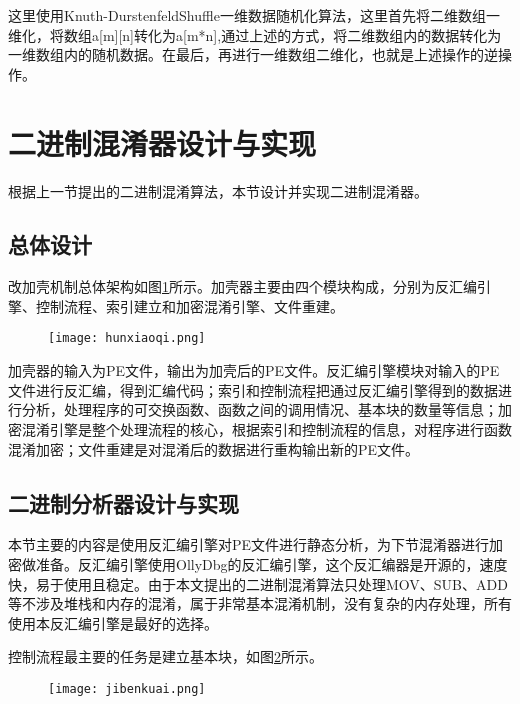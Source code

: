 这里使用Knuth-DurstenfeldShuffle一维数据随机化算法，这里首先将二维数组一维化，将数组a[m][n]转化为a[m*n],通过上述的方式，将二维数组内的数据转化为一维数组内的随机数据。在最后，再进行一维数组二维化，也就是上述操作的逆操作。


\section{二进制混淆器设计与实现}

根据上一节提出的二进制混淆算法，本节设计并实现二进制混淆器。

\subsection{总体设计}

改加壳机制总体架构如图\ref{hunxiaoqi}所示。加壳器主要由四个模块构成，分别为反汇编引擎、控制流程、索引建立和加密混淆引擎、文件重建。

\begin{figure}[htbp]
	\centering
	\texttt{[image: hunxiaoqi.png]}
	\label{hunxiaoqi}
\end{figure}

加壳器的输入为PE文件，输出为加壳后的PE文件。反汇编引擎模块对输入的PE文件进行反汇编，得到汇编代码；索引和控制流程把通过反汇编引擎得到的数据进行分析，处理程序的可交换函数、函数之间的调用情况、基本块的数量等信息；加密混淆引擎是整个处理流程的核心，根据索引和控制流程的信息，对程序进行函数混淆加密；文件重建是对混淆后的数据进行重构输出新的PE文件。

\subsection{二进制分析器设计与实现}
\label{san}

本节主要的内容是使用反汇编引擎对PE文件进行静态分析，为下节混淆器进行加密做准备。反汇编引擎使用OllyDbg的反汇编引擎，这个反汇编器是开源的，速度快，易于使用且稳定。由于本文提出的二进制混淆算法只处理MOV、SUB、ADD等不涉及堆栈和内存的混淆，属于非常基本混淆机制，没有复杂的内存处理，所有使用本反汇编引擎是最好的选择。

控制流程最主要的任务是建立基本块，如图\ref{jibenkuai}所示。

\begin{figure}[htbp]
	\centering
	\texttt{[image: jibenkuai.png]}
	\label{jibenkuai}
\end{figure}

